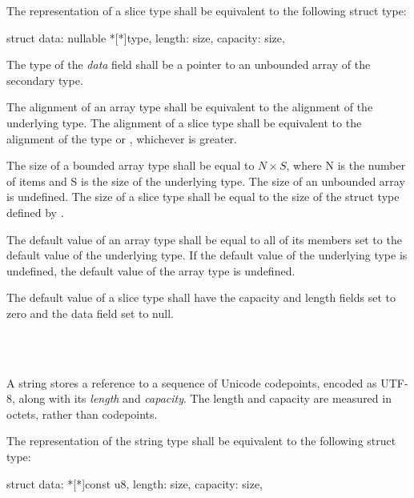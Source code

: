 \specsubsubitem
The representation of a slice type shall be equivalent to the following struct
type:

\begin{codesample}
struct {
	data: nullable *[*]type,
	length: size,
	capacity: size,
}
\end{codesample}

The type of the \textit{data} field shall be a pointer to an unbounded array of
the secondary type.

\specsubsubitem
The alignment of an array type shall be equivalent to the alignment of the
underlying type. The alignment of a slice type shall be equivalent to the
alignment of the  type or , whichever is
greater.

\specsubsubitem
The size of a bounded array type shall be equal to $N \times S$, where N is the
number of items and S is the size of the underlying type. The size of an
unbounded array is undefined. The size of a slice type shall be equal to the
size of the struct type defined by .

\specsubsubitem
The default value of an array type shall be equal to all of its members set to
the default value of the underlying type. If the default value of the
underlying type is undefined, the default value of the array type is undefined.

\specsubsubitem
The default value of a slice type shall have the capacity and length fields set
to zero and the data field set to null.


\begin{grammar}
 \\
	 \\
\end{grammar}

\specsubsubitem
A string stores a reference to a sequence of Unicode codepoints, encoded as
UTF-8, along with its \textit{length} and \textit{capacity}. The length and
capacity are measured in octets, rather than codepoints.

\specsubsubitem
The representation of the string type shall be equivalent to the following
struct type:

\begin{codesample}
struct {
	data: *[*]const u8,
	length: size,
	capacity: size,
}
\end{codesample}

